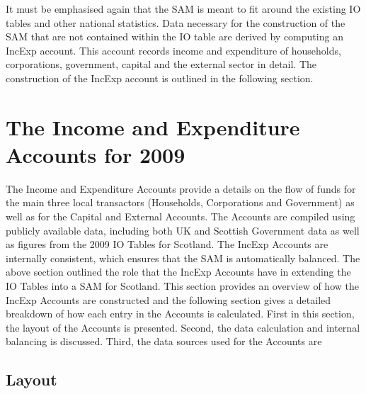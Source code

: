 \bigskip

It must be emphasised again that the SAM is meant to fit around the existing IO tables and other national statistics. Data necessary for the construction of the SAM that are not contained within the IO table are derived by computing an IncExp account. This account records income and expenditure of households, corporations, government, capital and the external sector in detail. The construction of the IncExp account is outlined in the following section.

\newpage
\section{The Income and Expenditure Accounts for 2009}
\label{sec:2.4}

The Income and Expenditure Accounts provide a details on the flow of funds for the main three local transactors (Households, Corporations and Government) as well as for the Capital and External Accounts. The Accounts are compiled using publicly available data, including both UK and Scottish Government data as well as figures from the 2009 IO Tables for Scotland. The IncExp Accounts are internally consistent, which ensures that the SAM is automatically balanced. The above section outlined the role that the IncExp Accounts have in extending the IO Tables into a SAM for Scotland. This section provides an overview of how the IncExp Accounts are constructed and the following section gives a detailed breakdown of how each entry in the Accounts is calculated. First in this section, the layout of the Accounts is presented. Second, the data calculation and internal balancing is discussed. Third, the data sources used for the Accounts are  


\subsection{Layout}
\label{sec:2.4.1}

